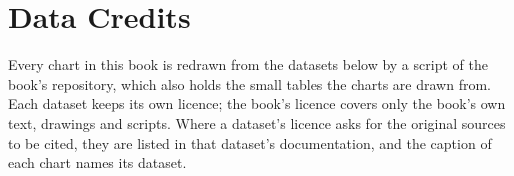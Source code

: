 \chapter*{Data Credits}

Every chart in this book is redrawn from the datasets below by a script of the
book's repository, which also holds the small tables the charts are drawn from.
Each dataset keeps its own licence; the book's licence covers only the book's
own text, drawings and scripts. Where a dataset's licence asks for the original
sources to be cited, they are listed in that dataset's documentation, and the
caption of each chart names its dataset.


